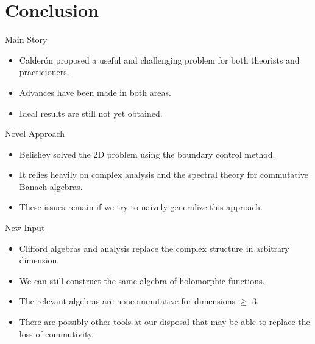 \documentclass[aspectratio=169]{beamer}
\begin{document}
\section{Conclusion}

\begin{frame}{Main Story}
    \begin{itemize}
        \pause
        \item Calder\'on proposed a useful and challenging problem for both theorists and practicioners.
        
        \pause
        \item Advances have been made in both areas.
        
        \pause
        \item Ideal results are still not yet obtained.
    \end{itemize}
\end{frame}

\begin{frame}{Novel Approach}
    \begin{itemize}
        \pause
        \item Belishev solved the 2D problem using the boundary control method.
        
        \pause
        \item It relies heavily on complex analysis and the spectral theory for commutative Banach algebras.
        
        \pause
        \item These issues remain if we try to naively generalize this approach.
    \end{itemize}
\end{frame}

\begin{frame}{New Input}
    \begin{itemize}
        \pause
        \item Clifford algebras and analysis replace the complex structure in arbitrary dimension.
        
        \pause
        \item We can still construct the same algebra of holomorphic functions.
        
        \pause
        \item The relevant algebras are noncommutative for dimensions $\geq$ 3.
        
        \pause
        \item There are possibly other tools at our disposal that may be able to replace the loss of commutivity.
    \end{itemize}
\end{frame}
\end{document}
